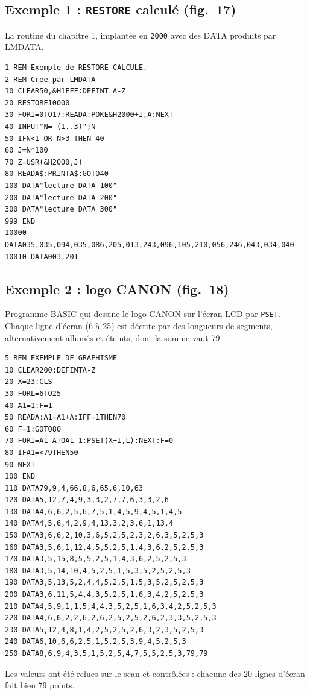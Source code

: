 \documentclass[a4paper,10pt]{article}
\newcommand{\hex}[1]{\texttt{#1}}
\begin{document}
\subsection*{Exemple 1 : \texttt{RESTORE} calculé (fig.~17)}
La routine du chapitre 1, implantée en \hex{2000} avec des DATA produits par
LMDATA.
\begin{verbatim}
1 REM Exemple de RESTORE CALCULE.
2 REM Cree par LMDATA
10 CLEAR50,&H1FFF:DEFINT A-Z
20 RESTORE10000
30 FORI=0TO17:READA:POKE&H2000+I,A:NEXT
40 INPUT"N= (1..3)";N
50 IFN<1 OR N>3 THEN 40
60 J=N*100
70 Z=USR(&H2000,J)
80 READA$:PRINTA$:GOTO40
100 DATA"lecture DATA 100"
200 DATA"lecture DATA 200"
300 DATA"lecture DATA 300"
999 END
10000 DATA035,035,094,035,086,205,013,243,096,105,210,056,246,043,034,040
10010 DATA003,201
\end{verbatim}

\subsection*{Exemple 2 : logo CANON (fig.~18)}
Programme BASIC qui dessine le logo CANON sur l'écran LCD par
\texttt{PSET}. Chaque ligne d'écran (6 à 25) est décrite par des longueurs de
segments, alternativement allumés et éteints, dont la somme vaut 79.
\begin{verbatim}
5 REM EXEMPLE DE GRAPHISME
10 CLEAR200:DEFINTA-Z
20 X=23:CLS
30 FORL=6TO25
40 A1=1:F=1
50 READA:A1=A1+A:IFF=1THEN70
60 F=1:GOTO80
70 FORI=A1-ATOA1-1:PSET(X+I,L):NEXT:F=0
80 IFA1=<79THEN50
90 NEXT
100 END
110 DATA79,9,4,66,8,6,65,6,10,63
120 DATA5,12,7,4,9,3,3,2,7,7,6,3,3,2,6
130 DATA4,6,6,2,5,6,7,5,1,4,5,9,4,5,1,4,5
140 DATA4,5,6,4,2,9,4,13,3,2,3,6,1,13,4
150 DATA3,6,6,2,10,3,6,5,2,5,2,3,2,6,3,5,2,5,3
160 DATA3,5,6,1,12,4,5,5,2,5,1,4,3,6,2,5,2,5,3
170 DATA3,5,15,8,5,5,2,5,1,4,3,6,2,5,2,5,3
180 DATA3,5,14,10,4,5,2,5,1,5,3,5,2,5,2,5,3
190 DATA3,5,13,5,2,4,4,5,2,5,1,5,3,5,2,5,2,5,3
200 DATA3,6,11,5,4,4,3,5,2,5,1,6,3,4,2,5,2,5,3
210 DATA4,5,9,1,1,5,4,4,3,5,2,5,1,6,3,4,2,5,2,5,3
220 DATA4,6,6,2,2,6,2,6,2,5,2,5,2,6,2,3,3,5,2,5,3
230 DATA5,12,4,8,1,4,2,5,2,5,2,6,3,2,3,5,2,5,3
240 DATA6,10,6,6,2,5,1,5,2,5,3,9,4,5,2,5,3
250 DATA8,6,9,4,3,5,1,5,2,5,4,7,5,5,2,5,3,79,79
\end{verbatim}
Les valeurs ont été relues sur le scan et contrôlées : chacune des 20 lignes
d'écran fait bien 79 points.
\end{document}
